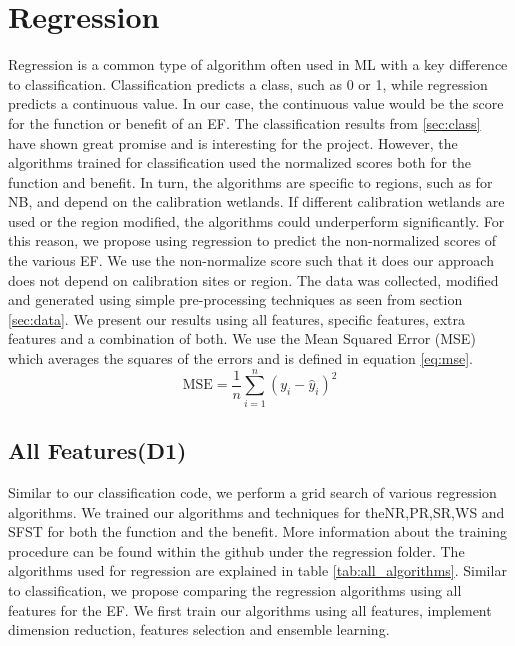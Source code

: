 \documentclass[12pt,letterpaper]{article}
\begin{document}
\newpage


\section{Regression}\label{sec:regression}
Regression is a common type of algorithm often used in \ac{ML} with a key difference to classification.
Classification predicts a class, such as 0 or 1, while regression predicts a continuous value.
In our case, the continuous value would be the score for the function or benefit of an \ac{EF}.
The classification results from \ref{sec:class} have shown great promise and is interesting for the project.
However, the algorithms trained for classification used the normalized scores both for the function and benefit.
In turn, the algorithms are specific to regions, such as for NB, and depend on the calibration wetlands.
If different calibration wetlands are used or the region modified, the algorithms could underperform significantly.
For this reason, we propose using regression to predict the non-normalized scores of the various \ac{EF}.
We use the non-normalize score such that it does our approach does not depend on calibration sites or region.
The data was collected, modified and generated using simple pre-processing techniques as seen from section \ref{sec:data}.
We present our results using all features, specific features, extra features and a combination of both.
We use the Mean Squared Error (MSE) which averages the squares of the errors and is defined in equation \ref{eq:mse}.
\begin{equation}
\text{MSE} = \frac{1}{n} \sum_{i=1}^n (y_i - \hat{y}_i)^2
\label{eq:mse}
\end{equation}

\subsection{All Features(D1)}
Similar to our classification code, we perform a grid search of various regression algorithms.
We trained our algorithms and techniques for the\ac{NR},\ac{PR},\ac{SR},\ac{WS} and \ac{SFST} for both the function and the benefit.
More information about the training procedure can be found within the github under the regression folder.
The algorithms used for regression are explained in table \ref{tab:all_algorithms}.
Similar to classification, we propose comparing the regression algorithms using all features for the \ac{EF}.
We first train our algorithms using all features, implement dimension reduction, features selection and ensemble learning.
\clearpage
\end{document}
